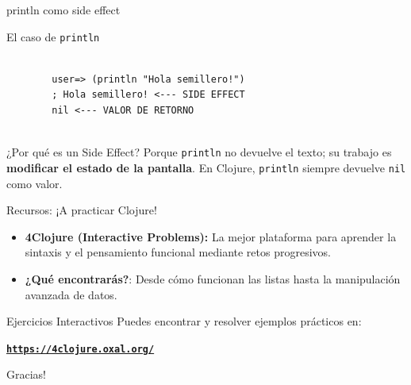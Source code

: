 \documentclass{beamer}
\begin{document}
\begin{frame}[fragile]{println como side effect}

    \begin{exampleblock}{El caso de \texttt{println}}
        \begin{verbatim}

        user=> (println "Hola semillero!")
        ; Hola semillero! <--- SIDE EFFECT 
        nil <--- VALOR DE RETORNO
        
        \end{verbatim}
    \end{exampleblock}

    \begin{alertblock}{¿Por qué es un Side Effect?}
        Porque \texttt{println} no devuelve el texto; su trabajo es \textbf{modificar el estado de la pantalla}. En Clojure, \texttt{println} siempre devuelve \texttt{nil} como valor.
    \end{alertblock}
\end{frame}

\begin{frame}{Recursos: ¡A practicar Clojure!}
    \begin{itemize}
        \item \textbf{4Clojure (Interactive Problems):} La mejor plataforma para aprender la sintaxis y el pensamiento funcional mediante retos progresivos.
        \item \textbf{¿Qué encontrarás?}: Desde cómo funcionan las listas hasta la manipulación avanzada de datos.
    \end{itemize}

    \begin{block}{Ejercicios Interactivos}
        Puedes encontrar y resolver ejemplos prácticos en:
        \vspace{0.3cm}
        \begin{center}
            \href{https://4clojure.oxal.org/}{\textbf{\texttt{https://4clojure.oxal.org/}}}
        \end{center}
    \end{block}
    
\end{frame}

\begin{emptyframe}
    Gracias!
\end{emptyframe}
\end{document}

